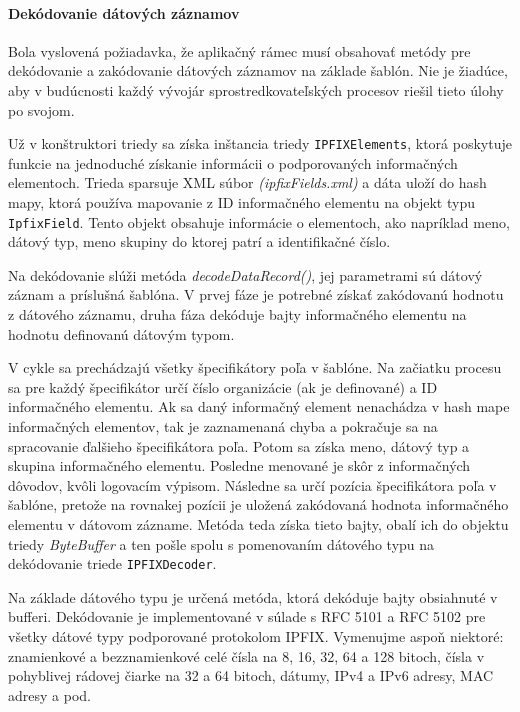 \paragraph{Dekódovanie dátových záznamov} 
Bola vyslovená požiadavka, že aplikačný rámec musí obsahovať metódy pre dekódovanie a zakódovanie 
dátových záznamov na základe šablón. Nie je žiadúce, aby v budúcnosti každý vývojár sprostredkovateľských 
procesov riešil tieto úlohy po svojom. 

Už v konštruktori triedy sa získa inštancia triedy \verb|IPFIXElements|, ktorá poskytuje 
funkcie na jednoduché získanie informácii o podporovaných informačných elementoch. Trieda sparsuje XML 
súbor \emph{(ipfixFields.xml)} a dáta uloží do hash mapy, ktorá používa mapovanie z ID informačného 
elementu na objekt typu \verb|IpfixField|. Tento objekt obsahuje informácie o elementoch, ako 
napríklad meno, dátový typ, meno skupiny do ktorej patrí a identifikačné číslo.\citep{veri}

Na dekódovanie slúži metóda \emph{decodeDataRecord()}, jej parametrami sú dátový záznam a príslušná
šablóna. V prvej fáze je potrebné získať zakódovanú hodnotu z dátového záznamu, druha fáza dekóduje 
bajty informačného elementu na hodnotu definovanú dátovým typom.

V cykle sa prechádzajú všetky špecifikátory poľa v šablóne. Na začiatku procesu sa pre každý 
špecifikátor určí číslo organizácie (ak je definované) a ID informačného elementu. Ak sa daný informačný
element nenachádza v hash mape informačných elementov, tak je zaznamenaná chyba a pokračuje sa 
na spracovanie ďalšieho špecifikátora poľa. Potom sa získa meno, dátový typ a skupina informačného elementu. 
Posledne menované je skôr z informačných dôvodov, kvôli logovacím výpisom. Následne sa určí pozícia 
špecifikátora poľa v šablóne, pretože na rovnakej pozícii je uložená zakódovaná hodnota informačného
elementu v dátovom zázname. Metóda teda získa tieto bajty, obalí ich do objektu triedy \emph{ByteBuffer}  
a ten pošle spolu s pomenovaním dátového typu na dekódovanie triede \verb|IPFIXDecoder|.

Na základe dátového typu je určená metóda, ktorá dekóduje 
bajty obsiahnuté v bufferi. Dekódovanie je implementované v súlade s RFC 5101 \citep{rfc5101} a 
RFC 5102 \citep{rfc5102} pre všetky dátové typy podporované protokolom IPFIX. Vymenujme aspoň niektoré:
znamienkové a bezznamienkové celé čísla na 8, 16, 32, 64 a 128 bitoch, čísla v pohyblivej rádovej čiarke na 
32 a 64 bitoch, dátumy, IPv4 a IPv6 adresy, MAC adresy a pod. 

